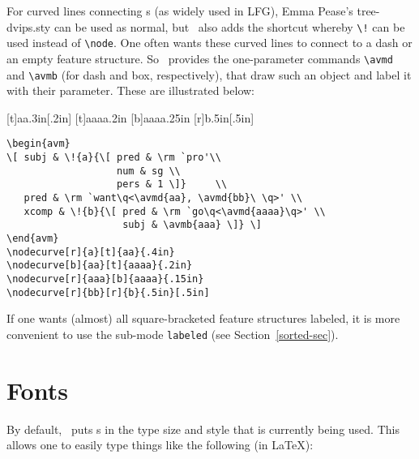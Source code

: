 For curved lines connecting {\AVM}s (as widely used in LFG), Emma Pease's
{\sf tree-dvips.sty} can be used as normal, but \av\ also adds the
shortcut whereby \verb+\!+ can be used instead of \verb+\node+.
One often wants these curved lines to connect to a dash or an empty
feature structure.  So \av\ provides the one-parameter commands
\verb+\avmd+ and \verb+\avmb+ (for dash and box, respectively), that draw
such an object and
label it with their parameter.  These are illustrated below:
%
\begin{examples}
\item
\nodemargin=0pt
[t]{aa}{.3in}[.2in] %
[t]{aaaa}{.2in}
[b]{aaaa}{.25in} %
[r]{b}{.5in}[.5in]

\item
{\obeyspaces\begin{verbatim}
\begin{avm}
\[ subj & \!{a}{\[ pred & \rm `pro'\\
                   num & sg \\
                   pers & 1 \]}		\\
   pred & \rm `want\q<\avmd{aa}, \avmd{bb}\ \q>' \\
   xcomp & \!{b}{\[ pred & \rm `go\q<\avmd{aaaa}\q>' \\
                    subj & \avmb{aaa} \]} \]
\end{avm}
\nodecurve[r]{a}[t]{aa}{.4in}
\nodecurve[b]{aa}[t]{aaaa}{.2in}
\nodecurve[r]{aaa}[b]{aaaa}{.15in}
\nodecurve[r]{bb}[r]{b}{.5in}[.5in]
\end{verbatim}}
\end{examples}
%
If one wants (almost) all square-bracketed feature structures labeled,
it is more convenient to use the sub-mode \verb+labeled+ (see
Section~\ref{sorted-sec}). 

\section{Fonts}
By default, \av\ puts {\AVM}s in the type size and style that is currently
being used.  This allows one to easily type things like the following (in
\LaTeX):

